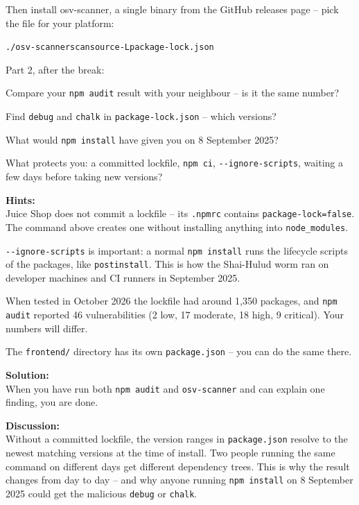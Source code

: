 \documentclass[a4paper,11pt,notitlepage]{report}
\begin{document}
Then install osv-scanner, a single binary from the GitHub releases page -- pick the file for your platform:\\

\begin{alltt}\footnotesize
./osv-scanner scan source -L package-lock.json
\end{alltt}

Part 2, after the break:
\begin{list2}
\item Compare your \verb+npm audit+ result with your neighbour -- is it the same number?
\item Find \verb+debug+ and \verb+chalk+ in \verb+package-lock.json+ -- which versions?
\item What would \verb+npm install+ have given you on 8 September 2025?
\item What protects you: a committed lockfile, \verb+npm ci+, \verb+--ignore-scripts+, waiting a few days before taking new versions?
\end{list2}

{\bf Hints:}\\
Juice Shop does not commit a lockfile -- its \verb+.npmrc+ contains \verb+package-lock=false+. The command above creates one without installing anything into \verb+node_modules+.

\verb+--ignore-scripts+ is important: a normal \verb+npm install+ runs the lifecycle scripts of the packages, like \verb+postinstall+. This is how the Shai-Hulud worm ran on developer machines and CI runners in September 2025.

When tested in October 2026 the lockfile had around 1,350 packages, and \verb+npm audit+ reported 46 vulnerabilities (2 low, 17 moderate, 18 high, 9 critical). Your numbers will differ.

The \verb+frontend/+ directory has its own \verb+package.json+ -- you can do the same there.

{\bf Solution:}\\
When you have run both \verb+npm audit+ and \verb+osv-scanner+ and can explain one finding, you are done.

{\bf Discussion:}\\
Without a committed lockfile, the version ranges in \verb+package.json+ resolve to the newest matching versions at the time of install. Two people running the same command on different days get different dependency trees. This is why the result changes from day to day -- and why anyone running \verb+npm install+ on 8 September 2025 could get the malicious \verb+debug+ or \verb+chalk+.
\end{document}
